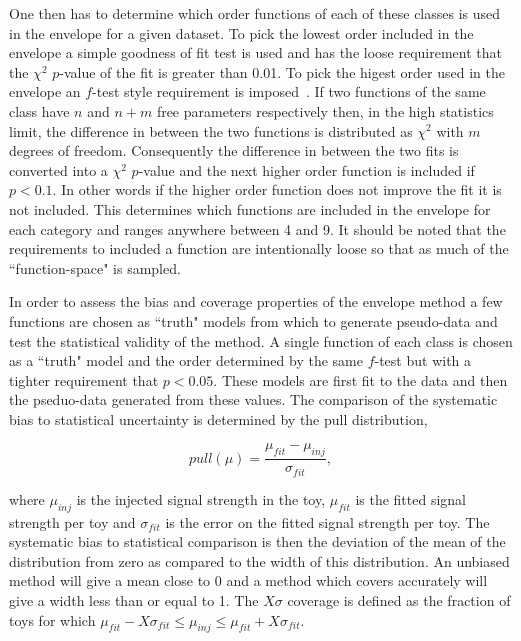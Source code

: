 One then has to determine which order functions of each of these classes is used in the envelope for a given dataset. To pick the lowest order included in the envelope a simple goodness of fit test is used and has the loose requirement that the $\chi^{2}$ $p$-value of the fit is greater than 0.01. To pick the higest order used in the envelope an $f$-test style requirement is imposed~\cite{ftest}. If two functions of the same class have $n$ and $n+m$ free parameters respectively then, in the high statistics limit, the difference in \NLL between the two functions is distributed as $\chi^{2}$ with $m$ degrees of freedom. Consequently the difference in \NLL between the two fits is converted into a $\chi^{2}$ $p$-value and the next higher order function is included if $p<0.1$. In other words if the higher order function does not improve the fit it is not included. This determines which functions are included in the envelope for each category and ranges anywhere between 4 and 9. It should be noted that the requirements to included a function are intentionally loose so that as much of the ``function-space" is sampled.

In order to assess the bias and coverage properties of the envelope method a few functions are chosen as ``truth" models from which to generate pseudo-data and test the statistical validity of the method. A single function of each class is chosen as a ``truth" model and the order determined by the same $f$-test but with a tighter requirement that $p<0.05$. These models are first fit to the data and then the pseduo-data generated from these values. The comparison of the systematic bias to statistical uncertainty is determined by the pull distribution,

\begin{equation}
  pull(\mu) = \frac{\mu_{fit} - \mu_{inj}}{\sigma_{fit}},
\end{equation}

where $\mu_{inj}$ is the injected signal strength in the toy, $\mu_{fit}$ is the fitted signal strength per toy and $\sigma_{fit}$ is the error on the fitted signal strength per toy. The systematic bias to statistical comparison is then the deviation of the mean of the distribution from zero as compared to the width of this distribution. An unbiased method will give a mean close to 0 and a method which covers accurately will give a width less than or equal to 1. The $X\sigma$ coverage is defined as the fraction of toys for which $\mu_{fit}-X\sigma_{fit}\leq\mu_{inj}\leq\mu_{fit}+X\sigma_{fit}$.

